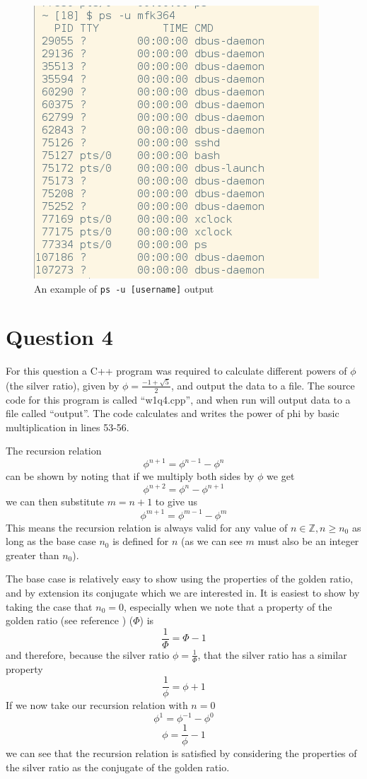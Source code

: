 \documentclass[a4paper,12pt]{UoBnote}
\begin{document}
\begin{enumerate}[label=\alph*)]
		\begin{figure}
			\centering
			\includegraphics[scale=0.4]{ps}
			\caption{An example of \texttt{ps -u [username]} output}
			\label{fig:ps}
		\end{figure}

\end{enumerate}

\section{Question 4}


For this question a C++ program was required to calculate different powers of $\phi$ (the silver ratio), given by $\phi = \frac{-1 + \sqrt{5}}{2}$, and output the data to a file. The source code for this program is called ``w1q4.cpp'', and when run will output data to a file called ``output''. The code calculates and writes the power of phi by basic multiplication in lines 53-56.

The recursion relation \[\phi^{n+1}=\phi^{n-1}-\phi^{n}\] can be shown by noting that if we multiply both sides by $\phi$ we get \[\phi^{n+2}=\phi^{n}-\phi^{n+1}\] we can then substitute $m=n+1$ to give us \[\phi^{m+1}=\phi^{m-1}-\phi^{m}\] This means the recursion relation is always valid for any value of $n\in\mathbb{Z}, n\geq n_0$ as long as the base case $n_0$ is defined for $n$ (as we can see $m$ must also be an integer greater than $n_0$).

The base case is relatively easy to show using the properties of the golden ratio, and by extension its conjugate which we are interested in. It is easiest to show by taking the case that $n_0=0$, especially when we note that a property of the golden ratio (see reference \cite{goldenratio}) ($\Phi$) is \[\frac{1}{\Phi}=\Phi-1\] and therefore, because the silver ratio $\phi=\frac{1}{\Phi}$, that the silver ratio has a similar property \[\frac{1}{\phi}=\phi+1\] If we now take our recursion relation with $n=0$ \[\phi^1=\phi^{-1}-\phi^0\] \[\phi=\frac{1}{\phi}-1\] we can see that the recursion relation is satisfied by considering the properties of the silver ratio as the conjugate of the golden ratio.
\end{document}
